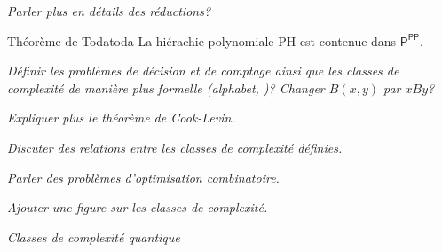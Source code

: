 \textcolor{mydarkred}{\textit{Parler plus en détails des réductions?}}

\begin{subtheorem}{Théorème de Toda}{toda}
    La hiérachie polynomiale \textsf{PH} est contenue dans $\textsf{P}^{\textsf{PP}}$.
\end{subtheorem}

\textcolor{mydarkred}{\textit{Définir les problèmes de décision et de comptage ainsi que les classes de complexité de manière plus formelle (alphabet, )? Changer $B(x,y)$ par $xBy$?}}

\textcolor{mydarkred}{\textit{Expliquer plus le théorème de Cook-Levin.}}

\textcolor{mydarkred}{\textit{Discuter des relations entre les classes de complexité définies.}}

\textcolor{mydarkred}{\textit{Parler des problèmes d'optimisation combinatoire.}}

\textcolor{mydarkred}{\textit{Ajouter une figure sur les classes de complexité.}}

\textcolor{mydarkred}{\textit{Classes de complexité quantique}}


